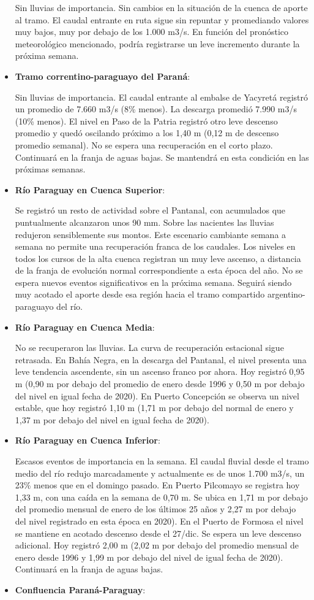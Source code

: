 \begin{itemize}
  Sin lluvias de importancia. Sin cambios en la situación de la cuenca
  de aporte al tramo. El caudal entrante en ruta sigue sin repuntar y
  promediando valores muy bajos, muy por debajo de los 1.000 m3/s. En
  función del pronóstico meteorológico mencionado, podría registrarse un
  leve incremento durante la próxima semana.
\item
  \textbf{Tramo correntino-paraguayo del Paraná}:

  Sin lluvias de importancia. El caudal entrante al embalse de Yacyretá
  registró un promedio de 7.660 m3/s (8\% menos). La descarga promedió
  7.990 m3/s (10\% menos). El nivel en Paso de la Patria registró otro
  leve descenso promedio y quedó oscilando próximo a los 1,40 m (0,12 m
  de descenso promedio semanal). No se espera una recuperación en el
  corto plazo. Continuará en la franja de aguas bajas. Se mantendrá en
  esta condición en las próximas semanas.
\item
  \textbf{Río Paraguay en Cuenca Superior}:

  Se registró un resto de actividad sobre el Pantanal, con acumulados
  que puntualmente alcanzaron unos 90 mm. Sobre las nacientes las
  lluvias redujeron sensiblemente sus montos. Este escenario cambiante
  semana a semana no permite una recuperación franca de los caudales.
  Los niveles en todos los cursos de la alta cuenca registran un muy
  leve ascenso, a distancia de la franja de evolución normal
  correspondiente a esta época del año. No se espera nuevos eventos
  significativos en la próxima semana. Seguirá siendo muy acotado el
  aporte desde esa región hacia el tramo compartido argentino-paraguayo
  del río.
\item
  \textbf{Río Paraguay en Cuenca Media}:

  No se recuperaron las lluvias. La curva de recuperación estacional
  sigue retrasada. En Bahía Negra, en la descarga del Pantanal, el nivel
  presenta una leve tendencia ascendente, sin un ascenso franco por
  ahora. Hoy registró 0,95 m (0,90 m por debajo del promedio de enero
  desde 1996 y 0,50 m por debajo del nivel en igual fecha de 2020). En
  Puerto Concepción se observa un nivel estable, que hoy registró 1,10 m
  (1,71 m por debajo del normal de enero y 1,37 m por debajo del nivel
  en igual fecha de 2020).
\item
  \textbf{Río Paraguay en Cuenca Inferior}:

  Escasos eventos de importancia en la semana. El caudal fluvial desde
  el tramo medio del río redujo marcadamente y actualmente es de unos
  1.700 m3/s, un 23\% menos que en el domingo pasado. En Puerto
  Pilcomayo se registra hoy 1,33 m, con una caída en la semana de 0,70
  m. Se ubica en 1,71 m por debajo del promedio mensual de enero de los
  últimos 25 años y 2,27 m por debajo del nivel registrado en esta época
  en 2020). En el Puerto de Formosa el nivel se mantiene en acotado
  descenso desde el 27/dic. Se espera un leve descenso adicional. Hoy
  registró 2,00 m (2,02 m por debajo del promedio mensual de enero desde
  1996 y 1,99 m por debajo del nivel de igual fecha de 2020). Continuará
  en la franja de aguas bajas.
\item
  \textbf{Confluencia Paraná-Paraguay}:


\end{itemize}

